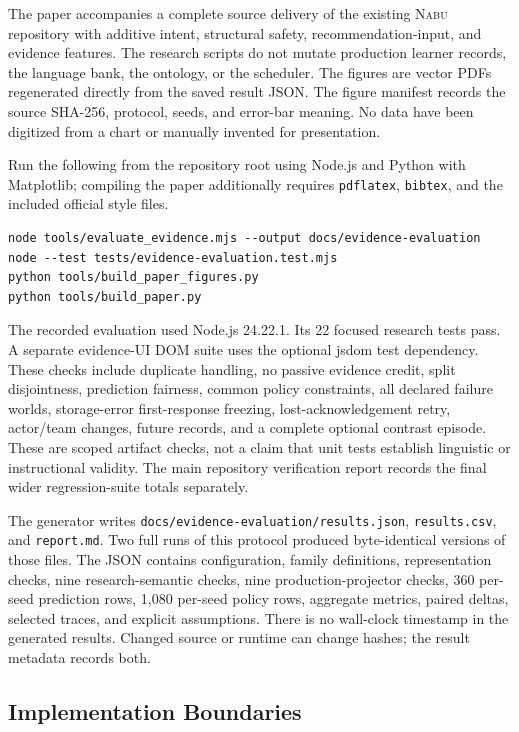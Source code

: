 \documentclass{article}
\newcommand{\Nabu}{\textsc{Nabu}}
\begin{document}
The paper accompanies a complete source delivery of the existing \Nabu{} repository with additive intent, structural safety, recommendation-input, and evidence features. The research scripts do not mutate production learner records, the language bank, the ontology, or the scheduler. The figures are vector PDFs regenerated directly from the saved result JSON. The figure manifest records the source SHA-256, protocol, seeds, and error-bar meaning. No data have been digitized from a chart or manually invented for presentation.

Run the following from the repository root using Node.js and Python with Matplotlib; compiling the paper additionally requires \texttt{pdflatex}, \texttt{bibtex}, and the included official style files.
\begin{verbatim}
node tools/evaluate_evidence.mjs --output docs/evidence-evaluation
node --test tests/evidence-evaluation.test.mjs
python tools/build_paper_figures.py
python tools/build_paper.py
\end{verbatim}

The recorded evaluation used Node.js 24.22.1. Its 22 focused research tests pass. A separate evidence-UI DOM suite uses the optional jsdom test dependency. These checks include duplicate handling, no passive evidence credit, split disjointness, prediction fairness, common policy constraints, all declared failure worlds, storage-error first-response freezing, lost-acknowledgement retry, actor/team changes, future records, and a complete optional contrast episode. These are scoped artifact checks, not a claim that unit tests establish linguistic or instructional validity. The main repository verification report records the final wider regression-suite totals separately.

The generator writes \texttt{docs/evidence-evaluation/results.json}, \texttt{results.csv}, and \texttt{report.md}. Two full runs of this protocol produced byte-identical versions of those files. The JSON contains configuration, family definitions, representation checks, nine research-semantic checks, nine production-projector checks, 360 per-seed prediction rows, 1,080 per-seed policy rows, aggregate metrics, paired deltas, selected traces, and explicit assumptions. There is no wall-clock timestamp in the generated results. Changed source or runtime can change hashes; the result metadata records both.

\subsection{Implementation Boundaries}
\end{document}
